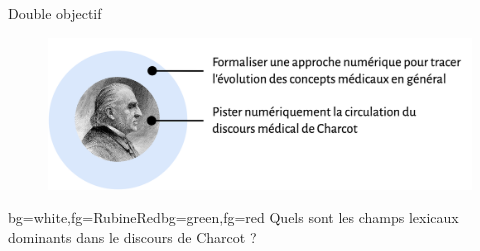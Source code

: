 \begin{frame}{Double objectif}
	        \begin{figure}
		\centering
		\includegraphics[width=1\textwidth]{pic/objectif_double2.png}
	\end{figure}

\begin{variableblock}{}{bg=white,fg=RubineRed}{bg=green,fg=red}
\centering
Quels sont les champs lexicaux dominants dans le discours de Charcot ?
\end{variableblock}

	
\end{frame}